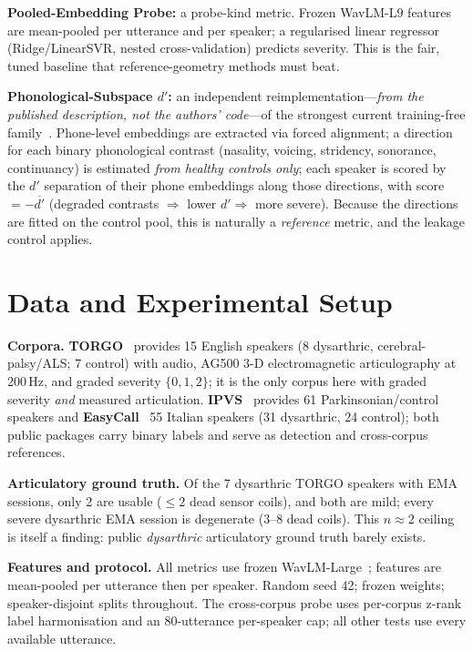\documentclass[runningheads]{llncs}
\begin{document}
\textbf{Pooled-Embedding Probe:} a probe-kind metric. Frozen WavLM-L9 features are
mean-pooled per utterance and per speaker; a regularised linear regressor
(Ridge/LinearSVR, nested cross-validation) predicts severity. This is the fair,
tuned baseline that reference-geometry methods must beat.

\textbf{Phonological-Subspace $d'$:} an independent reimplementation---\emph{from
the published description, not the authors' code}---of the strongest current
training-free family~\cite{muller2026cross,muller2026collapse}. Phone-level
embeddings are extracted via forced alignment; a direction for each binary
phonological contrast (nasality, voicing, stridency, sonorance, continuancy) is
estimated \emph{from healthy controls only}; each speaker is scored by the $d'$
separation of their phone embeddings along those directions, with score
$=-\overline{d'}$ (degraded contrasts $\Rightarrow$ lower $d'\Rightarrow$ more
severe). Because the directions are fitted on the control pool, this is naturally a
\emph{reference} metric, and the leakage control applies.

\section{Data and Experimental Setup}
\textbf{Corpora.} \textbf{TORGO}~\cite{rudzicz2012torgo} provides 15 English
speakers (8 dysarthric, cerebral-palsy/ALS; 7 control) with audio, AG500 3-D
electromagnetic articulography at 200\,Hz, and graded severity $\{0,1,2\}$; it is
the only corpus here with graded severity \emph{and} measured articulation.
\textbf{IPVS}~\cite{dimauro2017ipvs} provides 61 Parkinsonian/control speakers and
\textbf{EasyCall}~\cite{turrisi2021easycall} 55 Italian speakers (31 dysarthric,
24 control); both public packages carry binary labels and serve as detection and
cross-corpus references.

\textbf{Articulatory ground truth.} Of the 7 dysarthric TORGO speakers with EMA
sessions, only 2 are usable ($\le 2$ dead sensor coils), and both are mild; every
severe dysarthric EMA session is degenerate (3--8 dead coils). This
$n{\approx}2$ ceiling is itself a finding: public \emph{dysarthric} articulatory
ground truth barely exists.

\textbf{Features and protocol.} All metrics use frozen
WavLM-Large~\cite{chen2022wavlm}; features are mean-pooled per utterance then per
speaker. Random seed 42; frozen weights; speaker-disjoint splits throughout. The
cross-corpus probe uses per-corpus z-rank label harmonisation and an 80-utterance
per-speaker cap; all other tests use every available utterance.
\end{document}
